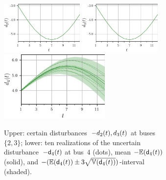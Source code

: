 \documentclass[final,3p,times,twocolumn]{elsarticle}  %
\begin{document}
\begin{figure}
    \begin{subfigure}[c]{\figwidth}
        \centering
        \includegraphics[width=0.45\textwidth]{figures/time series/case5_artificial/certain_disturbance_2.jpg}
        \includegraphics[width=0.45\textwidth]{figures/time series/case5_artificial/certain_disturbance_3.jpg}
        \includegraphics[width=0.6\textwidth, height=0.3\textwidth]{figures/time series/case5_artificial/uncertain_disturbance_4.jpg}
        \vspace{-2mm}
        \caption{Upper: certain disturbances~$-d_{2}(t), d_{3}(t)$ at buses $\{2,3\}$; lower: ten realizations of the uncertain disturbance~$-\mathsf{d}_4(t)$ at bus~$4$ (dots), mean $-\mathbb{E}(\mathsf{d}_4(t))$ (solid), and $-(\mathbb{E}(\mathsf{d}_4(t)) \pm 3\sqrt{\mathbb{V}(\mathsf{d}_4(t))})$-interval (shaded).}
        \label{fig:case5:Loads}
    \end{subfigure}
    
	\begin{subfigure}[c]{\figwidth}
		\centering
		

\end{subfigure}
\end{figure}
\end{document}
